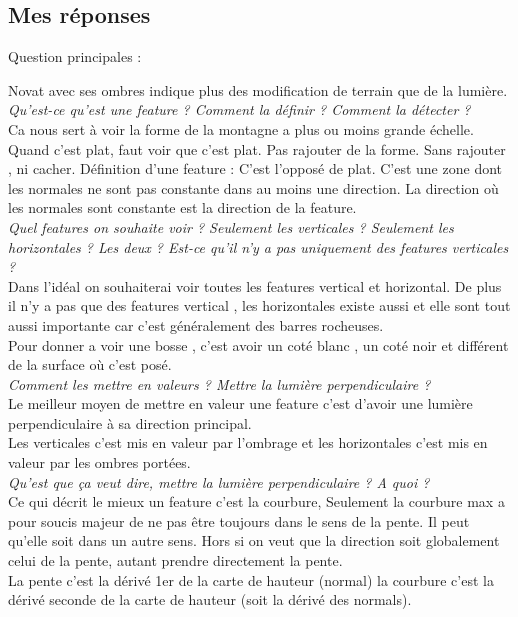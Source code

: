 \documentclass[a4paper]{article}
\begin{document}
\subsection{Mes réponses}
Question principales :

\textit{}
Novat avec ses ombres indique plus des modification de terrain que de la lumière.
\textit{Qu'est-ce qu'est une feature ? Comment la définir ? Comment la détecter ? }\\
Ca nous sert à voir la forme de la montagne a plus ou moins grande échelle. Quand c'est plat, faut voir que c'est plat. Pas rajouter de la forme. Sans rajouter , ni cacher.  
Définition d'une feature : C'est l'opposé de plat. C'est une zone dont les normales ne sont pas constante dans au moins une direction. La direction où les normales sont constante est la direction de la feature. \\
\textit{Quel features on souhaite voir ? Seulement les verticales ? Seulement les horizontales ? Les deux ? Est-ce qu'il n'y a pas uniquement des features verticales ?}\\ 
Dans l'idéal on souhaiterai voir toutes les features vertical et horizontal. De plus il n'y a pas que des features vertical , les horizontales existe aussi et elle sont tout aussi importante car c'est généralement des barres rocheuses. \\
Pour donner a voir une bosse , c'est avoir un coté blanc , un coté noir et différent de la surface où c'est posé. \\
\textit{Comment les mettre en valeurs ? Mettre la lumière perpendiculaire ?}\\
Le meilleur moyen de mettre en valeur une feature c'est d'avoir une lumière perpendiculaire à sa direction principal. \\
Les verticales c'est mis en valeur par l'ombrage et les horizontales c'est mis en valeur par les ombres portées. \\
\textit{Qu'est que ça veut dire, mettre la lumière perpendiculaire ? A quoi ? }\\
Ce qui décrit le mieux un feature c'est la courbure, Seulement la courbure max a pour soucis majeur de ne pas être toujours dans le sens de la pente. Il peut qu'elle soit dans un autre sens. Hors si on veut que la direction soit globalement celui de la pente, autant prendre directement la pente.  \\  
La pente c'est la dérivé 1er de la carte de hauteur (normal) la courbure c'est la dérivé seconde de la carte de hauteur (soit la dérivé des normals). \\
\end{document}
